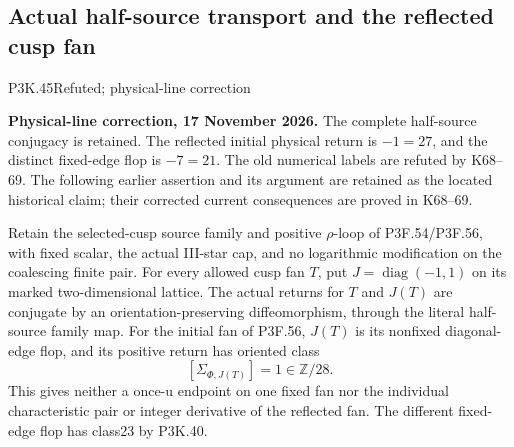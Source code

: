 \subsection{Actual half-source transport and the reflected cusp fan}
\begin{statement}{P3K.45}{Refuted; physical-line correction}\par\noindent\textbf{Physical-line correction, 17 November 2026.} The complete half-source conjugacy is retained. The reflected initial physical return is \(-1=27\), and the distinct fixed-edge flop is \(-7=21\). The old numerical labels are refuted by K68--69. The following earlier assertion and its argument are retained as the located historical claim; their corrected current consequences are proved in K68--69.\medskip\par 
Retain the selected-cusp source family and positive \(\rho\)-loop
of P3F.54/P3F.56, with fixed scalar, the actual III-star cap, and no
logarithmic modification on the coalescing finite pair. For every
allowed cusp fan \(T\), put \(J=\operatorname{diag}(-1,1)\)
on its marked two-dimensional lattice. The actual returns for
\(T\) and \(J(T)\) are conjugate by an orientation-preserving
diffeomorphism, through the literal half-source family map.
For the initial fan of P3F.56, \(J(T)\) is its nonfixed
diagonal-edge flop, and its positive return has oriented class
\[
                 [\Sigma_{\Phi,J(T)}]=1\in\mathbb Z/28.
\]
This gives neither a once-u endpoint on one fixed fan nor the
individual characteristic pair or integer derivative of the
reflected fan. The different fixed-edge flop has class23 by
P3K.40.
\end{statement}
